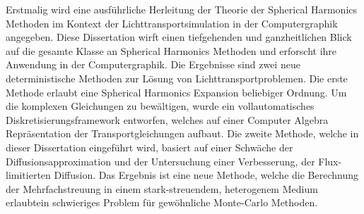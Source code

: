 Erstmalig wird eine ausführliche Herleitung der Theorie der Spherical Harmonics Methoden im Kontext der Lichttransportsimulation in der Computergraphik angegeben. Diese Dissertation wirft einen tiefgehenden und ganzheitlichen Blick auf die gesamte Klasse an Spherical Harmonics Methoden und erforscht ihre Anwendung in der Computergraphik. Die Ergebnisse sind zwei neue deterministische Methoden zur Lösung von Lichttransportproblemen. Die erste Methode erlaubt eine Spherical Harmonics Expansion beliebiger Ordnung. Um die komplexen Gleichungen zu bewältigen, wurde ein vollautomatisches Diskretisierungsframework entworfen, welches auf einer Computer Algebra Repräsentation der Transportgleichungen aufbaut. Die zweite Methode, welche in dieser Dissertation eingeführt wird, basiert auf einer Schwäche der Diffusionsapproximation und der Untersuchung einer Verbesserung, der Flux-limitierten Diffusion. Das Ergebnis ist eine neue Methode, welche die Berechnung der Mehrfachstreuung in einem stark-streuendem, heterogenem Medium erlaubt\mydash ein schwieriges Problem für gewöhnliche Monte-Carlo Methoden.
%
